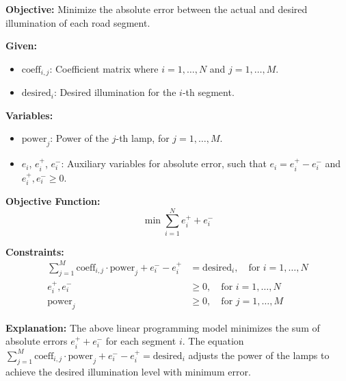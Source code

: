 \documentclass{article}
\begin{document}
\textbf{Objective:}
Minimize the absolute error between the actual and desired illumination of each road segment.

\textbf{Given:}
\begin{itemize}
    \item \(\text{coeff}_{i,j}\): Coefficient matrix where \(i = 1, \ldots, N\) and \(j = 1, \ldots, M\).
    \item \(\text{desired}_i\): Desired illumination for the \(i\)-th segment.
\end{itemize}

\textbf{Variables:}
\begin{itemize}
    \item \(\text{power}_j\): Power of the \(j\)-th lamp, for \(j = 1, \ldots, M\).
    \item \(e_i\), \(e_i^+\), \(e_i^-\): Auxiliary variables for absolute error, such that \(e_i = e_i^+ - e_i^-\) and \(e_i^+, e_i^- \geq 0\).
\end{itemize}

\textbf{Objective Function:}
\[
\min \sum_{i=1}^{N} e_i^+ + e_i^-
\]

\textbf{Constraints:}
\begin{align*}
\sum_{j=1}^{M} \text{coeff}_{i,j} \cdot \text{power}_j + e_i^- - e_i^+ &= \text{desired}_i, \quad \text{for } i = 1, \ldots, N \\
e_i^+, e_i^- &\geq 0, \quad \text{for } i = 1, \ldots, N \\
\text{power}_j &\geq 0, \quad \text{for } j = 1, \ldots, M
\end{align*}

\textbf{Explanation:}
The above linear programming model minimizes the sum of absolute errors \(e_i^+ + e_i^-\) for each segment \(i\). The equation \(\sum_{j=1}^{M} \text{coeff}_{i,j} \cdot \text{power}_j + e_i^- - e_i^+ = \text{desired}_i\) adjusts the power of the lamps to achieve the desired illumination level with minimum error.
\end{document}
